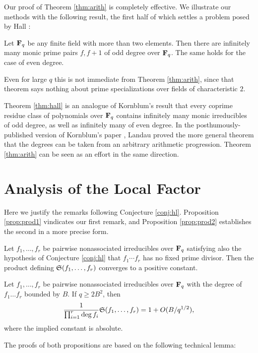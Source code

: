 \documentclass[a4paper]{compositio}
\begin{document}
Our proof of Theorem \ref{thm:arith} is completely effective. We
illustrate our methods with the following result, the first half of
which settles a problem posed by Hall \cite[p. 140]{hall06}:
\begin{thm}\label{thm:hall} Let $\mathbf{F}_q$ be any finite field with more than two elements.
Then there are infinitely many monic prime pairs $f, f+1$ of odd
degree over $\mathbf{F}_q$. The same holds for the case of even degree.
\end{thm}
\noindent Even for large $q$ this is not immediate from Theorem
\ref{thm:arith}, since that theorem says nothing about prime
specializations over fields of characteristic $2$.

Theorem \ref{thm:hall} is an analogue of Kornblum's result that
every coprime residue class of polynomials over $\mathbf{F}_q$ contains
infinitely many monic irreducibles of odd degree, as well as
infinitely many of even degree. In the posthumously-published
version of Kornblum's paper \cite{kornblum}, Landau proved the more
general theorem that the degrees can be taken from an arbitrary
arithmetic progression. Theorem \ref{thm:arith} can be seen as an
effort in the same direction.

\section{Analysis of the Local Factor}\label{sec:local}
Here we justify the remarks following Conjecture \ref{conj:hl}.
Proposition \ref{prop:prod1} vindicates our first remark, and
Proposition \ref{prop:prod2} establishes the second in a more
precise form.
\begin{prop}\label{prop:prod1} Let $f_1, \dots, f_r$ be pairwise nonassociated
irreducibles over $\mathbf{F}_q$ satisfying also the hypothesis of
Conjecture \ref{conj:hl} that $f_1\cdots f_r$ has no fixed prime
divisor. Then the product defining $\mathfrak{S}(f_1, \dots, f_r)$
converges to a positive constant.
\end{prop}

\begin{prop}\label{prop:prod2} Let $f_1, \dots, f_r$ be pairwise nonassociated
irreducibles over $\mathbf{F}_q$ with the degree of $f_1\dots f_r$ bounded
by $B$. If $q\geq 2B^2$, then
\[ \frac{1}{\prod_{i=1}^{r}\deg{f_i}} \mathfrak{S}(f_1, \dots, f_r) = 1 + O(B/q^{1/2}), \]
where the implied constant is absolute.
\end{prop}

The proofs of both propositions are based on the following technical
lemma:
\end{document}
